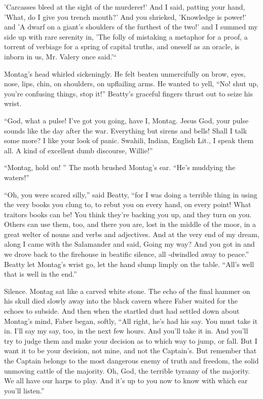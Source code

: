 \documentclass[11pt,openany]{book}
\begin{document}
'Carcasses bleed at the sight of the murderer!' And I said, patting your hand, 'What, do I give you trench mouth?' And you shrieked, 'Knowledge is power!' and 'A dwarf on a giant's shoulders of the furthest of the two!' and I summed my side up with rare serenity in, 'The folly of mistaking a metaphor for a proof, a torrent of verbiage for a spring of capital truths, and oneself as an oracle, is inborn in us, Mr. Valery once said.'``

Montag's head whirled sickeningly. He felt beaten unmercifully on brow, eyes, nose, lips, chin, on shoulders, on upflailing arms. He wanted to yell, ``No! shut up, you're confusing things, stop it!'' Beatty's graceful fingers thrust out to seize his wrist.

``God, what a pulse! I've got you going, have I, Montag. Jesus God, your pulse sounds like the day after the war. Everything but sirens and bells! Shall I talk some more? I like your look of panic. Swahili, Indian, English Lit., I speak them all. A kind of excellent dumb discourse, Willie!''

``Montag, hold on! '' The moth brushed Montag's ear. ``He's muddying the waters!''

``Oh, you were scared silly,'' said Beatty, ``for I was doing a terrible thing in using the very books you clung to, to rebut you on every hand, on every point! What traitors books can be! You think they're backing you up, and they turn on you. Others can use them, too, and there you are, lost in the middle of the moor, in a great welter of nouns and verbs and adjectives. And at the very end of my dream, along I came with the Salamander and said, Going my way? And you got in and we drove back to the firehouse in beatific silence, all -dwindled away to peace.'' Beatty let Montag's wrist go, let the hand slump limply on the table. ``All's well that is well in the end.''

Silence. Montag sat like a carved white stone. The echo of the final hammer on his skull died slowly away into the black cavern where Faber waited for the echoes to subside. And then when the startled dust had settled down about Montag's mind, Faber began, softly, ``All right, he's had his say. You must take it in. I'll say my say, too, in the next few hours. And you'll take it in. And you'll try to judge them and make your decision as to which way to jump, or fall. But I want it to be your decision, not mine, and not the Captain's. But remember that the Captain belongs to the most dangerous enemy of truth and freedom, the solid unmoving cattle of the majority. Oh, God, the terrible tyranny of the majority. We all have our harps to play. And it's up to you now to know with which ear you'll listen.''
\end{document}
